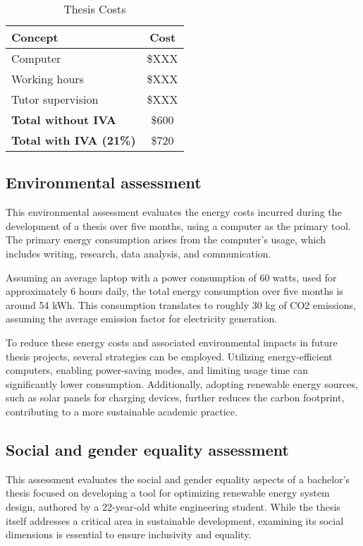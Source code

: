 \documentclass[a4paper,11pt, titlepage, twoside]{article}
\begin{document}
\begin{table}[h]
\centering
\begin{tabular}{l|c}
\hline
\textbf{Concept} & \textbf{Cost} \\
\hline
Computer & \$XXX \\
Working hours & \$XXX \\
Tutor supervision & \$XXX \\
\hline
\textbf{Total without IVA} & \$600 \\
\hline
\textbf{Total with IVA (21\%)} & \$720 \\
\hline
\end{tabular}
\caption{Thesis Costs}
\label{tab:costs}
\end{table}

\subsection{Environmental assessment}

This environmental assessment evaluates the energy costs incurred during
the development of a thesis over five months, using a computer as the primary tool. The primary energy consumption arises
from the computer's usage, which includes writing, research, data analysis, and communication.\par

Assuming an average laptop with a power consumption of 60 watts, used for approximately 6 hours daily, the total energy consumption
over five months is around 54 kWh. This consumption translates to roughly 30 kg of CO2 emissions, assuming the average emission
factor for electricity generation.\par

To reduce these energy costs and associated environmental impacts in future thesis projects, several strategies can be employed.
Utilizing energy-efficient computers, enabling power-saving modes, and limiting usage time can significantly lower consumption.
Additionally, adopting renewable energy sources, such as solar panels for charging devices, further reduces the carbon footprint,
contributing to a more sustainable academic practice.

\subsection{Social and gender equality assessment}

This assessment evaluates the social and gender equality aspects of a bachelor's thesis focused on developing a tool for optimizing renewable energy system design, authored by a 22-year-old white engineering student. While the thesis itself addresses a critical area in sustainable development, examining its social dimensions is essential to ensure inclusivity and equality.
\end{document}
